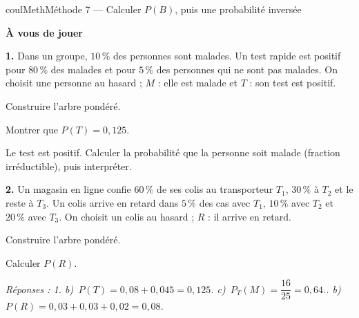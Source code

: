 \documentclass[11pt,a4paper]{article}
\makeatletter
\newcounter{lycee@signet}
\newcommand{\signet}[3][]{\stepcounter{lycee@signet}%
  \edef\lycee@dest{\if\relax\detokenize{#1}\relax
    signet.\arabic{lycee@signet}\else#1\fi}%
  \hypertarget{\lycee@dest}{}\bookmark[level=#2,dest=\lycee@dest]{#3}}
\newcounter{methode}
\newenvironment{methodebox}[1][Méthode]{\stepcounter{methode}%
  \begin{boitecours}[phantom={\signet[methode-\arabic{methode}]{2}{#1}}]{coulMeth}{#1}}%
  {\end{boitecours}}
\newcommand{\etape}[1]{\par\smallskip\textbf{\color{coulMeth}#1}\par\nobreak\smallskip}
\newcommand{\reponse}[1]{\par\smallskip
  {\footnotesize\itshape\color{black!55}Réponses : #1}}
\makeatother
\begin{document}
\begin{methodebox}[Méthode 7 --- Calculer $P(B)$, puis une probabilité \og inversée\fg]
\etape{À vous de jouer}
\textbf{1.} Dans un groupe, $10\,\%$ des personnes sont malades. Un test rapide est
positif pour $80\,\%$ des malades et pour $5\,\%$ des personnes qui ne sont pas
malades. On choisit une personne au hasard ; $M$ : \og elle est malade\fg{} et
$T$ : \og son test est positif\fg.
\begin{questions}[label=\alph*)]
  \item Construire l'arbre pondéré.
  \item Montrer que $P(T)=0{,}125$.
  \item Le test est positif. Calculer la probabilité que la personne soit malade
    (fraction irréductible), puis interpréter.
\end{questions}
\textbf{2.} Un magasin en ligne confie $60\,\%$ de ses colis au transporteur $T_{1}$,
$30\,\%$ à $T_{2}$ et le reste à $T_{3}$. Un colis arrive en retard dans $5\,\%$ des cas
avec $T_{1}$, $10\,\%$ avec $T_{2}$ et $20\,\%$ avec $T_{3}$. On choisit un colis au
hasard ; $R$ : \og il arrive en retard\fg.
\begin{questions}[label=\alph*)]
  \item Construire l'arbre pondéré.
  \item Calculer $P(R)$.
\end{questions}
\reponse{1. b)~$P(T)=0{,}08+0{,}045=0{,}125$.\; c)~$P_{T}(M)=\dfrac{16}{25}=0{,}64$.\;
2. b)~$P(R)=0{,}03+0{,}03+0{,}02=0{,}08$.}
\end{methodebox}
\end{document}
